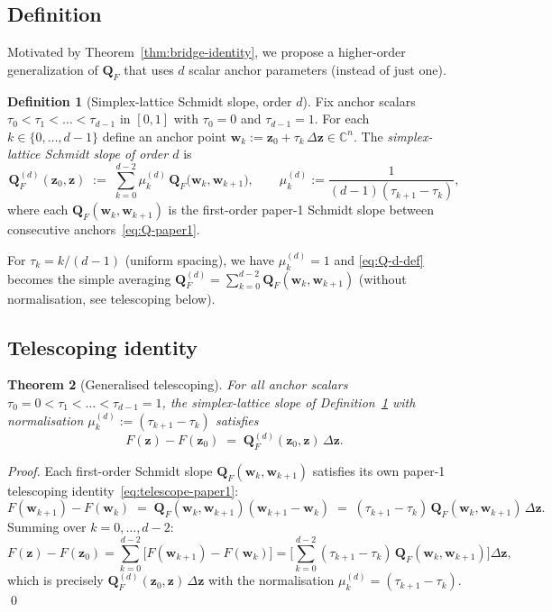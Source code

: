 \documentclass[11pt,a4paper]{article}
\newtheorem{theorem}{Theorem}[section]
\theoremstyle{definition}
\newtheorem{definition}[theorem]{Definition}
\theoremstyle{remark}
\newcommand{\C}{\mathbb{C}}
\newcommand{\zb}{\mathbf{z}}
\newcommand{\wb}{\mathbf{w}}
\newcommand{\Qb}{\mathbf{Q}}
\begin{document}
\subsection{Definition}

Motivated by Theorem~\ref{thm:bridge-identity}, we propose a higher-order
generalization of $\Qb_F$ that uses $d$ scalar anchor parameters (instead
of just one).

\begin{definition}[Simplex-lattice Schmidt slope, order $d$]\label{def:Q-d}
Fix anchor scalars $\tau_0 < \tau_1 < \dots < \tau_{d-1}$ in $[0, 1]$ with
$\tau_0 = 0$ and $\tau_{d-1} = 1$. For each $k \in \{0, \dots, d-1\}$
define an anchor point
$\wb_k := \zb_0 + \tau_k\,\Delta\zb \in \C^n$.
The \emph{simplex-lattice Schmidt slope of order $d$} is
\begin{equation}\label{eq:Q-d-def}
\Qb_F^{(d)}(\zb_0, \zb)
\;:=\;
\sum_{k=0}^{d-2} \mu_k^{(d)}\, \Qb_F\big(\wb_k, \wb_{k+1}\big),
\qquad
\mu_k^{(d)} := \frac{1}{(d-1)(\tau_{k+1} - \tau_k)},
\end{equation}
where each $\Qb_F(\wb_k, \wb_{k+1})$ is the first-order paper-1 Schmidt
slope between consecutive anchors~\eqref{eq:Q-paper1}.
\end{definition}

For $\tau_k = k/(d-1)$ (uniform spacing), we have $\mu_k^{(d)} = 1$ and
\eqref{eq:Q-d-def} becomes the simple averaging
$\Qb_F^{(d)} = \sum_{k=0}^{d-2} \Qb_F(\wb_k, \wb_{k+1})$
(without normalisation, see telescoping below).

\subsection{Telescoping identity}

\begin{theorem}[Generalised telescoping]\label{thm:telescoping}
For all anchor scalars $\tau_0 = 0 < \tau_1 < \dots < \tau_{d-1} = 1$,
the simplex-lattice slope of Definition~\ref{def:Q-d} with normalisation
$\mu_k^{(d)} := (\tau_{k+1} - \tau_k)$ satisfies
\begin{equation}\label{eq:telescope-d}
F(\zb) - F(\zb_0)
\;=\;
\Qb_F^{(d)}(\zb_0, \zb)\,\Delta\zb.
\end{equation}
\end{theorem}

\begin{proof}
Each first-order Schmidt slope $\Qb_F(\wb_k, \wb_{k+1})$ satisfies its own
paper-1 telescoping identity~\eqref{eq:telescope-paper1}:
\[
F(\wb_{k+1}) - F(\wb_k) \;=\; \Qb_F(\wb_k, \wb_{k+1}) (\wb_{k+1} - \wb_k)
\;=\; (\tau_{k+1} - \tau_k)\, \Qb_F(\wb_k, \wb_{k+1})\,\Delta\zb.
\]
Summing over $k = 0, \dots, d-2$:
\[
F(\zb) - F(\zb_0)
= \sum_{k=0}^{d-2} \big[F(\wb_{k+1}) - F(\wb_k)\big]
= \Big[\sum_{k=0}^{d-2} (\tau_{k+1} - \tau_k)\, \Qb_F(\wb_k, \wb_{k+1})\Big] \Delta\zb,
\]
which is precisely $\Qb_F^{(d)}(\zb_0, \zb)\, \Delta\zb$ with the normalisation
$\mu_k^{(d)} = (\tau_{k+1} - \tau_k)$. \qed
\end{proof}
\end{document}
